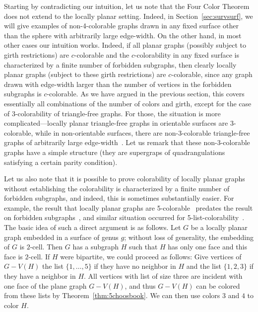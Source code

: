\documentclass[12pt,twoside,openright,a4paper]{book}
\begin{document}
Starting by contradicting our intuition, let us note that the Four Color Theorem does not extend to the locally planar setting.
Indeed, in Section~\ref{sec:survsurf}, we will give examples of non-4-colorable graphs drawn in any fixed surface other than the sphere
with arbitrarily large edge-width.  On the other hand, in most other cases our intuition works.  Indeed, if all planar graphs (possibly subject
to girth restrictions) are $c$-colorable and the $c$-colorability in any fixed surface is characterized by a finite number of forbidden subgraphs, then clearly
locally planar graphs (subject to these girth restrictions) are $c$-colorable, since any graph drawn with edge-width larger than the number of vertices in
the forbidden subgraphs is $c$-colorable.  As we have argued in the previous section, this covers essentially all combinations of the number of colors
and girth, except for the case of $3$-colorability of triangle-free graphs.  For those, the situation is more complicated---locally planar triangle-free
graphs in orientable surfaces are 3-colorable, while in non-orientable surfaces, there are non-3-colorable triangle-free graphs of arbitrarily large edge-width~\cite{trfree6}.
Let us remark that these non-3-colorable graphs have a simple structure (they are supergraps of quadrangulations satisfying a certain parity condition).

Let us also note that it is possible to prove colorability of locally planar graphs without establishing the colorability is characterized
by a finite number of forbidden subgraphs, and indeed, this is sometimes substantially easier.
For example, the result that locally planar graphs are 5-colorable~\cite{Th2} predates the result on forbidden subgraphs~\cite{Thomassen97},
and similar situation occurred for 5-list-colorability~\cite{DKM,lukethe}.  The basic idea of such a direct argument is as follows.
Let $G$ be a locally planar graph embedded in a surface of genus $g$; without loss of generality, the embedding of $G$ is $2$-cell.
Then $G$ has a subgraph $H$ such that $H$ has only one face and this face is $2$-cell.
If $H$ were bipartite, we could proceed as follows: Give vertices of $G-V(H)$ the list $\{1,\ldots,5\}$ if they have no
neighbor in $H$ and the list $\{1,2,3\}$ if they have a neighbor in $H$. All vertices with list of size three are
incident with one face of the plane graph $G-V(H)$, and thus $G-V(H)$ can be colored from these lists by Theorem~\ref{thm:5choosbook}.
We can then use colors $3$ and $4$ to color $H$.
\end{document}
